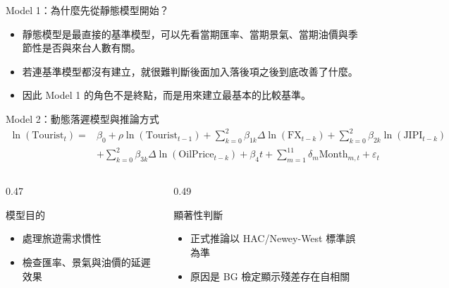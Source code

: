 \documentclass[aspectratio=169]{ctexbeamer}
\begin{document}
\begin{frame}{Model 1：為什麼先從靜態模型開始？}
\begin{itemize}
  \item 靜態模型是最直接的基準模型，可以先看當期匯率、當期景氣、當期油價與季節性是否與來台人數有關。
  \item 若連基準模型都沒有建立，就很難判斷後面加入落後項之後到底改善了什麼。
  \item 因此 Model 1 的角色不是終點，而是用來建立最基本的比較基準。
\end{itemize}
\end{frame}

\begin{frame}{Model 2：動態落遲模型與推論方式}
\scriptsize
\[
\begin{aligned}
\ln(\mathrm{Tourist}_t)= {}&
\beta_0+\rho\ln(\mathrm{Tourist}_{t-1})
+\sum_{k=0}^{2}\beta_{1k}\Delta\ln(\mathrm{FX}_{t-k})
+\sum_{k=0}^{2}\beta_{2k}\ln(\mathrm{JIPI}_{t-k})\\
&+\sum_{k=0}^{2}\beta_{3k}\Delta\ln(\mathrm{OilPrice}_{t-k})
+\beta_4 t+\sum_{m=1}^{11}\delta_m\mathrm{Month}_{m,t}+\varepsilon_t
\end{aligned}
\]
\begin{columns}[T]
  \begin{column}{0.47\textwidth}
    \begin{block}{模型目的}
    \begin{itemize}
      \item 處理旅遊需求慣性
      \item 檢查匯率、景氣與油價的延遲效果
    \end{itemize}
    \end{block}
  \end{column}
  \begin{column}{0.49\textwidth}
    \begin{block}{顯著性判斷}
    \begin{itemize}
      \item 正式推論以 HAC/Newey-West 標準誤為準
      \item 原因是 BG 檢定顯示殘差存在自相關
    \end{itemize}
    \end{block}
  \end{column}
\end{columns}
\end{frame}
\end{document}
